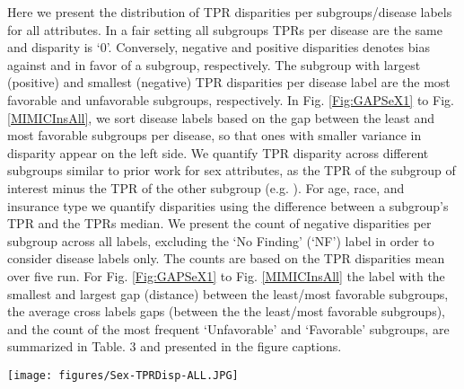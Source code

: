 \documentclass{ws-procs11x85}
\begin{document}
Here we present the distribution of TPR disparities per subgroups/disease labels for all attributes. In a fair setting all subgroups TPRs per disease are the same and disparity is `0'. Conversely, negative and positive disparities denotes bias against and in favor of a subgroup, respectively. The subgroup with largest (positive) and smallest (negative) TPR disparities per disease label are the most favorable and unfavorable subgroups, respectively.  In Fig. \ref{Fig:GAPSeX1} to Fig. \ref{MIMICInsAll}, we sort disease labels based on the gap between the least and most favorable subgroups per disease, so that ones with smaller variance in disparity appear on the left side.  We quantify TPR disparity across different subgroups similar to prior work \cite{de2019bias} for sex attributes, as the TPR of the subgroup of interest minus the TPR of the other subgroup (e.g.  ). For age, race, and insurance type we quantify disparities using the difference between a subgroup's TPR and the TPRs median. We present the count of negative disparities per subgroup across all labels, excluding the `No Finding' (`NF') label in order to consider disease labels only.  The counts are based on the TPR disparities mean over five run. For Fig. \ref{Fig:GAPSeX1} to Fig. \ref{MIMICInsAll} the label with the smallest and largest gap (distance) between the least/most favorable subgroups, the average cross labels gaps (between the the least/most favorable subgroups), and the count of the most frequent `Unfavorable' and `Favorable' subgroups, are summarized in Table. 3 and presented in the figure captions. 


\begin{figure*}[!htb]   
    \centering
      \texttt{[image: figures/Sex-TPRDisp-ALL.JPG]}
      \caption{The sorted distribution of the TPR sex disparity in ALL dataset per disease. The -axis labels are the disease names. The scatter plot's circle area is proportional to the patients percentages per subgroup. The TPR disparities are averaged over five run 95\% CI. The 95\% CI are shown with arrows around the TPR disparities mean scatter plot. The average cross labels gaps between the the least/most favorable subgroups is 0.045. Female are the most unfavorable subgroups with 4/7 count of negative disparities in disease labels where `Male' are the most favorable subgroups. Here, `Effusion' is the label with the smallest gap (0.001) between the least/most favorable subgroups, where `Pneumonia' has the largest gap (0.105).  }
       
      \label{Fig:GAPSeX1}

  \end{figure*}
\end{document}
